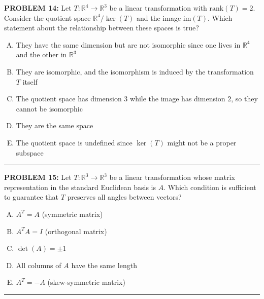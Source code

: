 \documentclass[12pt]{amsart}
\newcommand{\divider}{
  \vspace{-1em} %
  \noindent
  \raisebox{-0.15ex}{\textbullet}%
  \hspace{0.5em}%
  \rule[0.5ex]{0.95\textwidth}{1.0pt}%
  \hspace{0.5em}%
  \raisebox{-0.15ex}{\textbullet}%
  \vspace{0em} %
}
\begin{document}
{\bf PROBLEM 14:}
Let $T: \mathbb{R}^4 \to \mathbb{R}^3$ be a linear transformation with $\text{rank}(T) = 2$. 
Consider the quotient space $\mathbb{R}^4/\ker(T)$ and the image $\text{im}(T)$. 
Which statement about the relationship between these spaces is true?
%
\begin{enumerate}[(A)]
\item They have the same dimension but are not isomorphic since one lives in $\mathbb{R}^4$ and the other in $\mathbb{R}^3$
\item They are isomorphic, and the isomorphism is induced by the transformation $T$ itself
\item The quotient space has dimension $3$ while the image has dimension $2$, so they cannot be isomorphic
\item They are the same space
\item The quotient space is undefined since $\ker(T)$ might not be a proper subspace
\end{enumerate}
%

\divider

\newpage


{\bf PROBLEM 15:}
Let $T: \mathbb{R}^3 \to \mathbb{R}^3$ be a linear transformation whose matrix representation in the standard Euclidean basis is $A$. 
Which condition is sufficient to guarantee that $T$ preserves all angles between vectors?
%
\begin{enumerate}[(A)]
\item $A^T = A$ (symmetric matrix)
\item $A^TA = I$ (orthogonal matrix)
\item $\det(A) = \pm 1$
\item All columns of $A$ have the same length
\item $A^T = -A$ (skew-symmetric matrix)
\end{enumerate}
%
%
\divider
\end{document}
